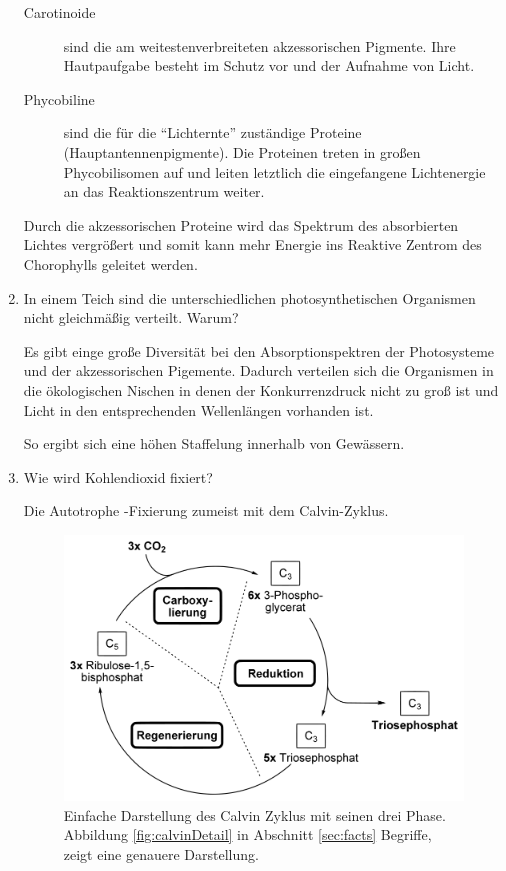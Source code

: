 \begin{enumerate}
		\begin{description}
			\item[Carotinoide]
				sind die am weitestenverbreiteten akzessorischen Pigmente.
				Ihre Hautpaufgabe besteht im Schutz vor und der Aufnahme von Licht.
			\item[Phycobiline] 
				sind die für die ``Lichternte'' zuständige Proteine (Hauptantennenpigmente).
				Die Proteinen treten in großen Phycobilisomen auf und leiten letztlich die
				eingefangene Lichtenergie an das Reaktionszentrum weiter.
		\end{description}

		Durch die akzessorischen Proteine wird das Spektrum des absorbierten Lichtes vergrößert
		und somit kann mehr Energie ins Reaktive Zentrom des Chorophylls geleitet werden.

	\item In einem Teich sind die unterschiedlichen photosynthetischen Organismen nicht gleichmäßig verteilt. Warum?

		Es gibt einge große Diversität bei den Absorptionspektren der Photosysteme
		und der akzessorischen Pigemente.
		Dadurch verteilen sich die Organismen in die ökologischen Nischen
		in denen der Konkurrenzdruck nicht zu groß ist
		und Licht in den entsprechenden Wellenlängen vorhanden ist.

		So ergibt sich eine höhen Staffelung innerhalb von Gewässern.

	\item Wie wird Kohlendioxid fixiert?

		Die Autotrophe -Fixierung zumeist mit dem Calvin-Zyklus.
		
		\begin{figure}[ht!]
		\leavevmode
		\begin{center}
		\includegraphics[scale=0.33]{./pictures/calvin_simple_1000}
		\end{center}
		\caption{Einfache Darstellung des Calvin Zyklus mit seinen drei Phase. 
		Abbildung \ref{fig:calvinDetail} in Abschnitt \ref{sec:facts} Begriffe,
		zeigt eine genauere Darstellung.}
		\label{fig:calvinSimple}
		\end{figure}


\end{enumerate}
